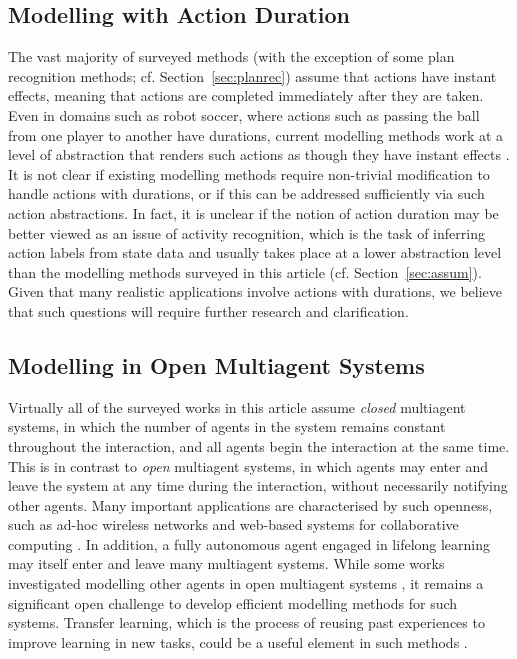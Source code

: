 \documentclass[final,1p,times,authoryear]{elsarticle}
\begin{document}
		\subsection{Modelling with Action Duration}

The vast majority of surveyed methods (with the exception of some plan recognition methods; cf. Section~\ref{sec:planrec}) assume that actions have instant effects, meaning that actions are completed immediately after they are taken. Even in domains such as robot soccer, where actions such as passing the ball from one player to another have durations, current modelling methods work at a level of abstraction that renders such actions as though they have instant effects \citep[e.g.][]{bdfe2010,kfcv2002}. It is not clear if existing modelling methods require non-trivial modification to handle actions with durations, or if this can be addressed sufficiently via such action abstractions. In fact, it is unclear if the notion of action duration may be better viewed as an issue of activity recognition, which is the task of inferring action labels from state data and usually takes place at a lower abstraction level than the modelling methods surveyed in this article (cf. Section~\ref{sec:assum}). Given that many realistic applications involve actions with durations, we believe that such questions will require further research and clarification.


		\subsection{Modelling in Open Multiagent Systems}

Virtually all of the surveyed works in this article assume \emph{closed} multiagent systems, in which the number of agents in the system remains constant throughout the interaction, and all agents begin the interaction at the same time. This is in contrast to \emph{open} multiagent systems, in which agents may enter and leave the system at any time during the interaction, without necessarily notifying other agents. Many important applications are characterised by such openness, such as ad-hoc wireless networks \citep{rt1999} and web-based systems for collaborative computing \citep{mmrn2014}. In addition, a fully autonomous agent engaged in lifelong learning \citep{hr2013} may itself enter and leave many multiagent systems. While some works investigated modelling other agents in open multiagent systems \citep{ceds016,hjs2006,rw2003}, it remains a significant open challenge to develop efficient modelling methods for such systems. Transfer learning, which is the process of reusing past experiences to improve learning in new tasks, could be a useful element in such methods \citep[e.g.][]{bskr2013}.
\end{document}
